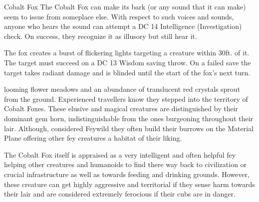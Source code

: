 \documentclass[letterpaper,openany,oneside,twocolumn]{book}
\begin{document}
\begin{DndMonster}[width=0.5\textwidth]{Cobalt Fox}
	The Cobalt Fox can make its bark (or any sound that it can make) seem to issue from someplace else. With respect to such voices and sounds, anyone who hears the sound can attempt a DC 14 Intelligence (Investigation) check. On success, they recognize it as illusory but still hear it.
    
	\DndMonsterAttack[
      name=Bite,
      distance=melee, %
      mod=+2,
      reach=5,
      targets=one target,
      dmg=\DndDice{2d4 + 2},
      dmg-type=piercing,
    ]
    
    \DndMonsterAttack[
      name=Gore,
      distance=melee, %
      mod=+4,
      reach=5,
      targets=one target,
      dmg=\DndDice{2d6 + 2},
      dmg-type=piercing,
    ]
    
    The fox creates a burst of flickering lights targeting a creature within 30ft. of it. The target must succeed on a DC 13 Wisdom saving throw. On a failed save the target takes  radiant damage and is blinded until the start of the fox's next turn.
      
\end{DndMonster}

\vfill\eject


\entryfont \noindent {}looming flower meadows and an abundance of translucent red crystals sprout from the ground. Experienced travellers know they stepped into the territory of Cobalt Foxes. These elusive and magical creatures are distinguished by their dominant gem horn, indistinguishable from the ones burgeoning throughout their lair. Although, considered Feywild they often build their burrows on the Material Plane offering other fey creatures a habitat of their liking.

 The Cobalt Fox itself is appraised as a very intelligent and often helpful fey helping other creatures and humanoids to find there way back to civilization or crucial infrastructure as well as towards feeding and drinking grounds. However, these creature can get highly aggressive and territorial if they sense harm towards their lair and are considered extremely ferocious if their cubs are in danger.\\
\end{document}
